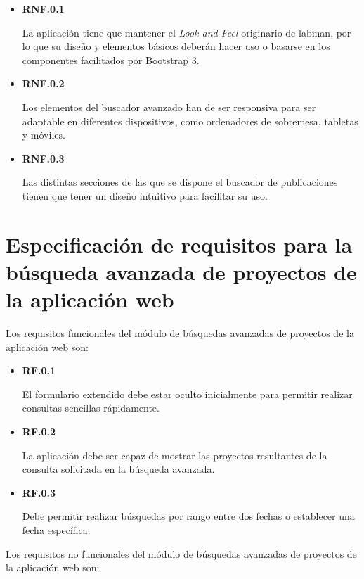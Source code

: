 \begin{itemize}
	\item \textbf{RNF.0.1}

	La aplicación tiene que mantener el \textit{Look and Feel} originario de \acrshort{labman}, por lo que su diseño y elementos básicos deberán hacer uso o basarse en los componentes facilitados por Bootstrap 3\cite{Bootstrap}.

	\item \textbf{RNF.0.2}

	Los elementos del buscador avanzado han de ser responsiva para ser adaptable en diferentes dispositivos, como ordenadores de sobremesa, tabletas y móviles.

	\item \textbf{RNF.0.3}

	Las distintas secciones de las que se dispone el buscador de publicaciones tienen que tener un diseño intuitivo para facilitar su uso.	
\end{itemize}


\section{Especificación de requisitos para la búsqueda avanzada de proyectos de la aplicación web}

Los requisitos funcionales del módulo de búsquedas avanzadas de proyectos de la aplicación web son:

\begin{itemize}
	\item \textbf{RF.0.1}

	El formulario extendido debe estar oculto inicialmente para permitir realizar consultas sencillas rápidamente.

	\item \textbf{RF.0.2}

	La aplicación debe ser capaz de mostrar las proyectos resultantes de la consulta solicitada en la búsqueda avanzada.

	\item \textbf{RF.0.3}

	Debe permitir realizar búsquedas por rango entre dos fechas o establecer una fecha específica.
	
\end{itemize}

Los requisitos no funcionales del módulo de búsquedas avanzadas de proyectos de la aplicación web son:

